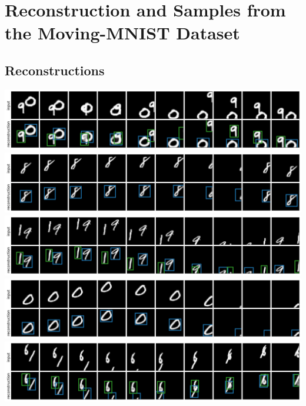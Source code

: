 \section{Reconstruction and Samples from the Moving-MNIST Dataset}
\label{app:mnist_visual}


\subsection{Reconstructions}
\begin{center}

    \includegraphics[width=\linewidth]{figures/SQAIR/mnist_rec/000047.png}
    \includegraphics[width=\linewidth]{figures/SQAIR/mnist_rec/000050.png}
    \includegraphics[width=\linewidth]{figures/SQAIR/mnist_rec/000070.png}
    \includegraphics[width=\linewidth]{figures/SQAIR/mnist_rec/000074.png}
    \includegraphics[width=\linewidth]{figures/SQAIR/mnist_rec/000087.png}

\end{center}
